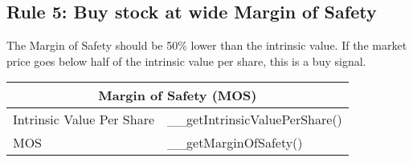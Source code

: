 \subsection{Rule 5: Buy stock at wide Margin of Safety}

The Margin of Safety should be 50\% lower than the intrinsic value. If the market
price goes below half of the intrinsic value per share, this is a buy signal.\\

\begin{tabularx}{\textwidth}{|X|X|}
 \hline
 \multicolumn{2}{|c|}{Margin of Safety (MOS)} \\
 \hline
 Intrinsic Value Per Share & __getIntrinsicValuePerShare() \\
 \rowcolor{lightgray} MOS  & __getMarginOfSafety() \\
 \hline
\end{tabularx}
